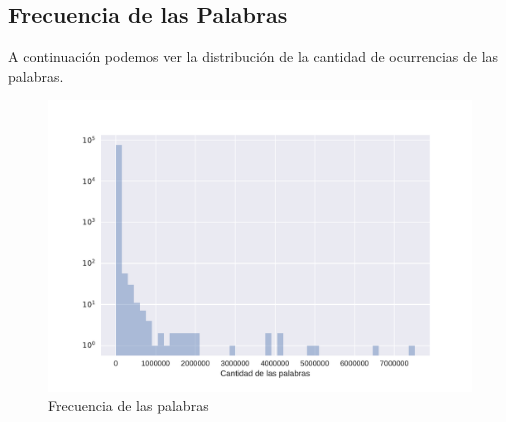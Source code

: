 






\subsection{Frecuencia de las Palabras}
\label{sub: frecuenciaPalabras}
A continuación podemos ver la distribución de la cantidad de ocurrencias de las palabras.
\begin{figure}[h]
\centering
\includegraphics[scale=0.6]{./images/DistribucionOcurrenciasPalabras.pdf} 
\caption{Frecuencia de las palabras} 
\label{fig:cantPalabras} 
\end{figure}

